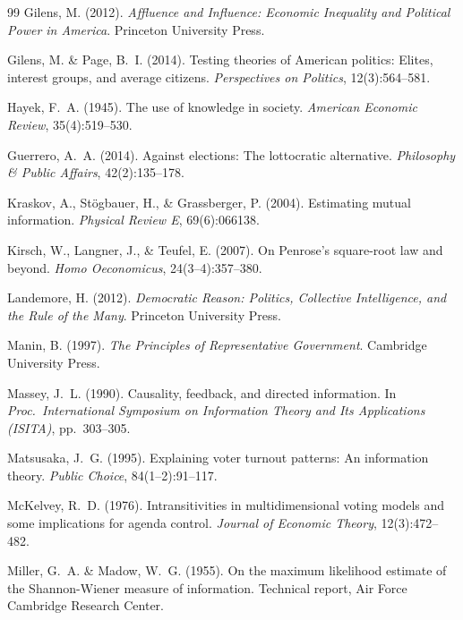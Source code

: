\documentclass[twocolumn,10pt]{article}
\begin{document}
\begin{thebibliography}{99}
Gilens, M. (2012).
\newblock \emph{Affluence and Influence: Economic Inequality and Political Power in America}.
\newblock Princeton University Press.

Gilens, M. \& Page, B.~I. (2014).
\newblock Testing theories of {A}merican politics: Elites, interest groups, and average citizens.
\newblock \emph{Perspectives on Politics}, 12(3):564--581.

Hayek, F.~A. (1945).
\newblock The use of knowledge in society.
\newblock \emph{American Economic Review}, 35(4):519--530.

Guerrero, A.~A. (2014).
\newblock Against elections: The lottocratic alternative.
\newblock \emph{Philosophy \& Public Affairs}, 42(2):135--178.

Kraskov, A., St\"{o}gbauer, H., \& Grassberger, P. (2004).
\newblock Estimating mutual information.
\newblock \emph{Physical Review E}, 69(6):066138.

Kirsch, W., Langner, J., \& Teufel, E. (2007).
\newblock On {P}enrose's square-root law and beyond.
\newblock \emph{Homo Oeconomicus}, 24(3--4):357--380.

Landemore, H. (2012).
\newblock \emph{Democratic Reason: Politics, Collective Intelligence, and the Rule of the Many}.
\newblock Princeton University Press.

Manin, B. (1997).
\newblock \emph{The Principles of Representative Government}.
\newblock Cambridge University Press.

Massey, J.~L. (1990).
\newblock Causality, feedback, and directed information.
\newblock In \emph{Proc.\ International Symposium on Information Theory and Its Applications (ISITA)}, pp.~303--305.

Matsusaka, J.~G. (1995).
\newblock Explaining voter turnout patterns: An information theory.
\newblock \emph{Public Choice}, 84(1--2):91--117.

McKelvey, R.~D. (1976).
\newblock Intransitivities in multidimensional voting models and some implications for agenda control.
\newblock \emph{Journal of Economic Theory}, 12(3):472--482.

Miller, G.~A. \& Madow, W.~G. (1955).
\newblock On the maximum likelihood estimate of the {S}hannon-{W}iener measure of information.
\newblock Technical report, Air Force Cambridge Research Center.


\end{thebibliography}
\end{document}
